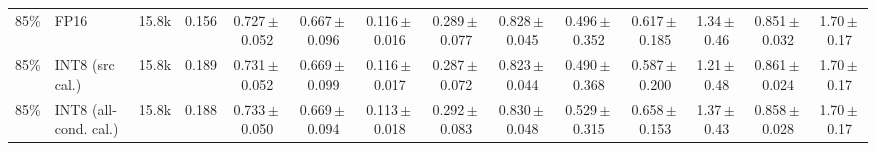 \begin{tabular}{rl r r cccccccccc}
85\% & FP16 & 15.8k & 0.156 & 0.727\,$\pm$\,0.052 & 0.667\,$\pm$\,0.096 & 0.116\,$\pm$\,0.016 & 0.289\,$\pm$\,0.077 & 0.828\,$\pm$\,0.045 & 0.496\,$\pm$\,0.352 & 0.617\,$\pm$\,0.185 & 1.34\,$\pm$\,0.46 & 0.851\,$\pm$\,0.032 & 1.70\,$\pm$\,0.17 \\
85\% & INT8 (src cal.) & 15.8k & 0.189 & 0.731\,$\pm$\,0.052 & 0.669\,$\pm$\,0.099 & 0.116\,$\pm$\,0.017 & 0.287\,$\pm$\,0.072 & 0.823\,$\pm$\,0.044 & 0.490\,$\pm$\,0.368 & 0.587\,$\pm$\,0.200 & 1.21\,$\pm$\,0.48 & 0.861\,$\pm$\,0.024 & 1.70\,$\pm$\,0.17 \\
85\% & INT8 (all-cond. cal.) & 15.8k & 0.188 & 0.733\,$\pm$\,0.050 & 0.669\,$\pm$\,0.094 & 0.113\,$\pm$\,0.018 & 0.292\,$\pm$\,0.083 & 0.830\,$\pm$\,0.048 & 0.529\,$\pm$\,0.315 & 0.658\,$\pm$\,0.153 & 1.37\,$\pm$\,0.43 & 0.858\,$\pm$\,0.028 & 1.70\,$\pm$\,0.17 \\
\bottomrule
\end{tabular}